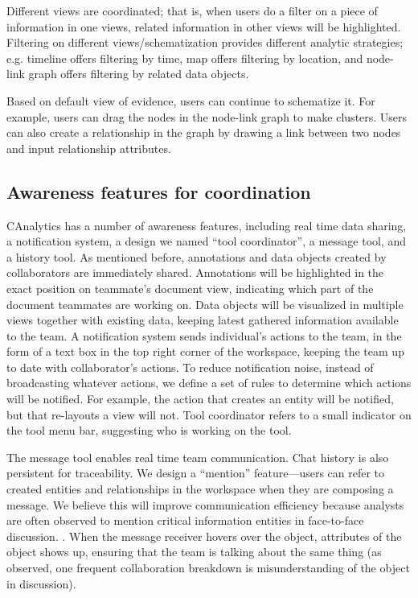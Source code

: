 Different views are coordinated; that is, when users do a filter on a piece of information in one views, related information in other views will be highlighted. Filtering on different views/schematization provides different analytic strategies; e.g. timeline offers filtering by time, map offers filtering by location, and node-link graph offers filtering by related data objects.

Based on default view of evidence, users can continue to schematize it. For example, users can drag the nodes in the node-link graph to make clusters. Users can also create a relationship in the graph by drawing a link between two nodes and input relationship attributes. 

\subsection{Awareness features for coordination}
	
CAnalytics has a number of awareness features, including real time data sharing, a notification system,  a design we named ``tool coordinator'', a message tool, and a history tool. As mentioned before, annotations and data objects created by collaborators are immediately shared. Annotations will be highlighted in the exact position on teammate's document view, indicating which part of the document teammates are working on. Data objects will be visualized in multiple views together with existing data, keeping latest gathered information available to the team. A notification system sends individual's actions to the team, in the form of a text box in the top right corner of the workspace, keeping the team up to date with collaborator's actions. To reduce notification noise, instead of broadcasting whatever actions, we define a set of rules to determine which actions will be notified. For example, the action that creates an entity will be notified, but that re-layouts a view will not. Tool coordinator refers to a small indicator on the tool menu bar, suggesting who is working on the tool. 

The message tool enables real time team communication. Chat history is also persistent for traceability. We design a ``mention'' feature---users can refer to created entities and relationships in the workspace when they are composing a message. We believe this will improve communication efficiency because analysts are often observed to mention critical information entities in face-to-face discussion. \cite{Carroll2013}. When the message receiver hovers over the object, attributes of the object shows up, ensuring that the team is talking about the same thing (as \cite{Carroll2013} observed, one frequent collaboration breakdown is misunderstanding of the object in discussion). 

